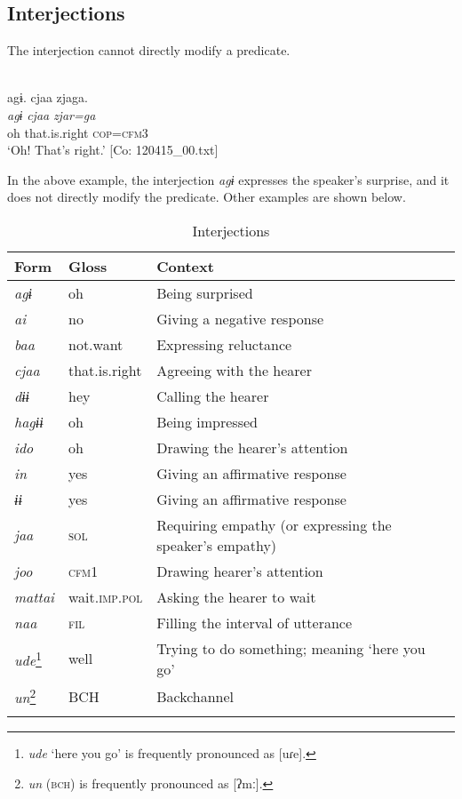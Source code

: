 \subsection{Interjections}\label{sec:4.3.7}

The interjection cannot directly modify a predicate.

\ea{}\label{ex:4.56}\\
\glll    agɨ.  cjaa  zjaga.  \\
    \textit{agɨ}  \textit{cjaa}  \textit{zjar=ga}  \\
    oh  that.is.right  \textsc{cop}=\textsc{cfm}3  \\
  \glt     ‘Oh! That’s right.’ [Co: 120415\_00.txt]
\z

In the above example, the interjection \textit{agɨ} expresses the speaker’s surprise, and it does not directly modify the predicate. Other examples are shown below.

\begin{table}
\caption{\label{tab:29}Interjections}
\begin{tabular}{lll}
\lsptoprule
Form & Gloss & Context\\\midrule
\textit{agɨ}   & oh              & Being surprised\\
\textit{ai}    & no              & Giving a negative response\\
\textit{baa}   & not.want        & Expressing reluctance\\
\textit{cjaa}  &  that.is.right  & Agreeing with the hearer\\
\textit{dɨɨ}   & hey             & Calling the hearer\\
\textit{hagɨɨ} & oh            & Being impressed\\
\textit{ido}   & oh              & Drawing the hearer’s attention\\
\textit{in}    & yes              & Giving an affirmative response\\
\textit{ɨɨ}    & yes              & Giving an affirmative response\\
\textit{jaa}   & \textsc{sol}             & Requiring empathy (or expressing the speaker’s empathy)\\
\textit{joo}   & \textsc{cfm}1            & Drawing hearer’s attention\\
\textit{mattai} &  wait.\textsc{imp}.\textsc{pol} & Asking the hearer to wait\\
\textit{naa}   & \textsc{fil}             & Filling the interval of utterance\\
\textit{ude}\footnote{\textit{ude} ‘here you go’ is frequently pronounced as [uɾe].} & well & Trying to do something; meaning ‘here you go’\\
\textit{un}\footnote{\textit{un} (\textsc{bch}) is frequently pronounced as [ʔmː].}    & BCH   &Backchannel\\
\lspbottomrule
\end{tabular}
\end{table}


